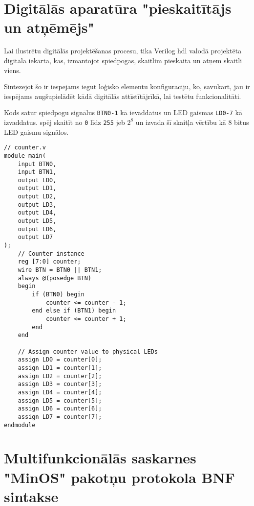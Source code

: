 \renewcommand{\thesection}{\arabic{section}}
\titleformat{\section}{\normalfont\large\bfseries}{\thesection. Pielikums.}{1em}{}

\section{Digitālās aparatūra "pieskaitītājs un atņēmējs"}
\label{att:counter}

Lai ilustrētu digitālās projektēšanas procesu, tika Verilog \gls{hdl} valodā
projektēta digitāla iekārta, kas, izmantojot spiedpogas, skaitlim pieskaita un
atņem skaitli viens.

Sintezējot šo  ir iespējams iegūt loģisko
elementu konfigurāciju, ko, savukārt, jau ir iespējams augšupielādēt kādā
digitālās  attīstītājrīkā, lai testētu
 funkcionalitāti. 

Kods satur spiedpogu signālus \lstinline!BTN0-1! kā ievaddatus un LED gaismas
\lstinline!LD0-7! kā izvaddatus.  spēj
skaitīt no \lstinline!0! līdz \lstinline!255! jeb \(2^8\) un izvada šī skaitļa
vērtību kā 8 bitus LED gaismu signālos.

\begin{lstlisting}
// counter.v
module main(
    input BTN0,
    input BTN1,
    output LD0,
    output LD1,
    output LD2,
    output LD3,
    output LD4,
    output LD5,
    output LD6,
    output LD7
);
    // Counter instance
    reg [7:0] counter;
    wire BTN = BTN0 || BTN1;
    always @(posedge BTN)
    begin
        if (BTN0) begin
            counter <= counter - 1;
        end else if (BTN1) begin
            counter <= counter + 1;
        end
    end

    // Assign counter value to physical LEDs
    assign LD0 = counter[0];
    assign LD1 = counter[1];
    assign LD2 = counter[2];
    assign LD3 = counter[3];
    assign LD4 = counter[4];
    assign LD5 = counter[5];
    assign LD6 = counter[6];
    assign LD7 = counter[7];
endmodule    
\end{lstlisting}
  
\section{Multifunkcionālās saskarnes "MinOS" pakotņu protokola BNF sintakse}
\label{att:minosbnf}

